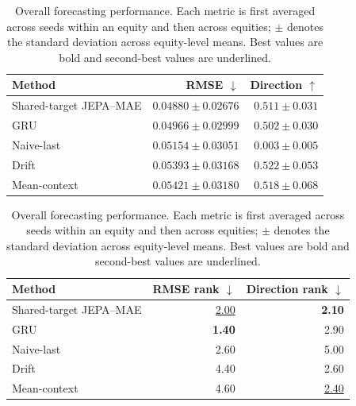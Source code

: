 \begin{table}[t]
\centering
\small
\caption{Overall forecasting performance. Each metric is first averaged across seeds within an equity and then across equities; $\pm$ denotes the standard deviation across equity-level means. Best values are bold and second-best values are underlined.}
\label{tab:main_metrics}
\begin{tabular}{lrr}
\toprule
Method & RMSE $\downarrow$ & Direction $\uparrow$ \\
\midrule
Shared-target JEPA--MAE & \textbf{$0.04880 \pm 0.02676$} & $0.511 \pm 0.031$ \\
GRU & \underline{$0.04966 \pm 0.02999$} & $0.502 \pm 0.030$ \\
Naive-last & $0.05154 \pm 0.03051$ & $0.003 \pm 0.005$ \\
Drift & $0.05393 \pm 0.03168$ & \textbf{$0.522 \pm 0.053$} \\
Mean-context & $0.05421 \pm 0.03180$ & \underline{$0.518 \pm 0.068$} \\
\bottomrule
\end{tabular}
\par\medskip
\begin{tabular}{lrr}
\toprule
Method & RMSE rank $\downarrow$ & Direction rank $\downarrow$ \\
\midrule
Shared-target JEPA--MAE & \underline{2.00} & \textbf{2.10} \\
GRU & \textbf{1.40} & 2.90 \\
Naive-last & 2.60 & 5.00 \\
Drift & 4.40 & 2.60 \\
Mean-context & 4.60 & \underline{2.40} \\
\bottomrule
\end{tabular}
\end{table}
